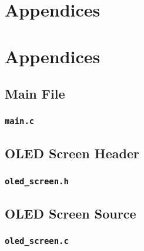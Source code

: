 \section{Appendices}

\section{Appendices}

\subsection{Main File}
\subsubsection{\texttt{main.c}}


\subsection{OLED Screen Header}
\subsubsection{\texttt{oled\_screen.h}}


\subsection{OLED Screen Source}
\subsubsection{\texttt{oled\_screen.c}}
